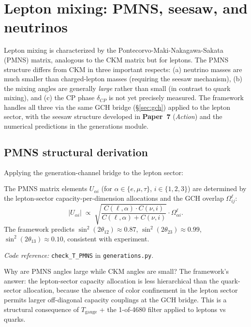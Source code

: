 \documentclass[11pt]{article}
\newcommand{\coderef}[2]{\smallskip\noindent\textit{Code reference:} \texttt{#1} in \texttt{#2}.}
\newcommand{\epitag}[1]{\textbf{[#1]}}
\newcommand{\paperref}[2]{\textbf{Paper~#1} (\textit{#2})}
\theoremstyle{definition}
\begin{document}
\section{Lepton mixing: PMNS, seesaw, and neutrinos}\label{sec:pmns}

Lepton mixing is characterized by the Pontecorvo-Maki-Nakagawa-Sakata (PMNS) matrix, analogous to the CKM matrix but for leptons. The PMNS structure differs from CKM in three important respects: (a) neutrino masses are much smaller than charged-lepton masses (requiring the seesaw mechanism), (b) the mixing angles are generally \emph{large} rather than small (in contrast to quark mixing), and (c) the CP phase $\delta_{CP}$ is not yet precisely measured. The framework handles all three via the same GCH bridge (\S\ref{sec:gch}) applied to the lepton sector, with the seesaw structure developed in \paperref{7}{Action} and the numerical predictions in the generations module.

\subsection{PMNS structural derivation}\label{sec:pmns_derivation}

Applying the generation-channel bridge to the lepton sector:

\begin{tcolorbox}[apfbox, title={$T_{\mathrm{PMNS}}$ \epitag{P\_structural}}]
The PMNS matrix elements $U_{\alpha i}$ (for $\alpha \in \{e, \mu, \tau\}$, $i \in \{1, 2, 3\}$) are determined by the lepton-sector capacity-per-dimension allocations and the GCH overlap $\Omega^{\ell}_{ij}$:
\[
|U_{\alpha i}| \;\propto\; \sqrt{\frac{C(\ell, \alpha) \cdot C(\nu, i)}{C(\ell, \alpha) + C(\nu, i)}} \cdot \Omega^{\ell}_{\alpha i}.
\]
The framework predicts $\sin^2(2\theta_{12}) \approx 0.87$, $\sin^2(2\theta_{23}) \approx 0.99$, $\sin^2(2\theta_{13}) \approx 0.10$, consistent with experiment.
\end{tcolorbox}

\coderef{check\_T\_PMNS}{generations.py}

Why are PMNS angles large while CKM angles are small? The framework's answer: the lepton-sector capacity allocation is less hierarchical than the quark-sector allocation, because the absence of color confinement in the lepton sector permits larger off-diagonal capacity couplings at the GCH bridge. This is a structural consequence of $T_{\mathrm{gauge}}$ + the 1-of-4680 filter applied to leptons vs quarks.
\end{document}
